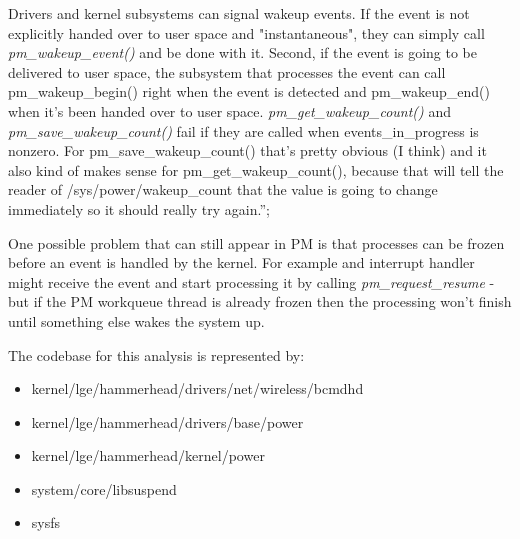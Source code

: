 Drivers and kernel subsystems can signal wakeup events. If the event is not explicitly handed over to user space and "instantaneous", they can simply call \textit{pm_wakeup_event()} and be done with it. Second, if the event is going to be delivered to user space, the subsystem that processes the event can call pm_wakeup_begin() right when the event is detected and pm_wakeup_end() when it's been handed over to user space. \textit{pm_get_wakeup_count()} and \textit{pm_save_wakeup_count()} fail if they are called when events_in_progress is nonzero. For pm_save_wakeup_count() that's pretty obvious (I think) and it also kind of makes sense for pm_get_wakeup_count(), because that will tell the reader of /sys/power/wakeup_count that the value is going to change immediately so it should really try again.”;

One possible problem that can still appear in PM is that processes can be frozen before an event is handled by the kernel. For example and interrupt handler might receive the event and start processing it by calling \textit {pm_request_resume} - but if the PM workqueue thread is already frozen then the processing won't finish until something else wakes the system up.

The codebase for this analysis is represented by:
\begin{itemize}
  \item kernel/lge/hammerhead/drivers/net/wireless/bcmdhd
  \item kernel/lge/hammerhead/drivers/base/power
  \item kernel/lge/hammerhead/kernel/power
  \item system/core/libsuspend
  \item sysfs
\end{itemize}

 

 









